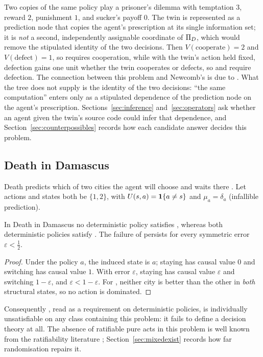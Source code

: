 Two copies of the same policy play a prisoner's dilemma with temptation $3$, reward $2$, punishment
$1$, and sucker's payoff $0$. The twin is represented as a prediction node that copies the agent's
prescription at its single information set; it is \emph{not} a second, independently assignable
coordinate of $\Pi_D$, which would remove the stipulated identity of the two decisions. Then
$V(\text{cooperate})=2$ and $V(\text{defect})=1$, so  requires cooperation, while with the
twin's action held fixed, defection gains one unit whether the twin cooperates or defects, so
 and  require defection. The connection between this problem and Newcomb's is due to
\textcite{lewis1979}. What the tree does not supply is the identity of the two decisions:
\enquote{the same computation} enters only as a stipulated dependence of the prediction node on
the agent's prescription. Sections~\ref{sec:inference} and~\ref{sec:operators} ask whether an agent
given the twin's source code could infer that dependence, and Section~\ref{sec:counterpossibles}
records how each candidate answer decides this problem.

\subsection{Death in Damascus}\label{sec:did}

Death predicts which of two cities the agent will choose and waits there
\autocite{gibbardharper1978}. Let actions and states both be $\{1,2\}$, with
$U(s,a)=\mathbf{1}\{a\neq s\}$ and $\mu_a=\delta_a$ (infallible prediction).

\begin{proposition}\label{prop:did}
In Death in Damascus no deterministic policy satisfies , whereas both deterministic policies
satisfy . The failure of  persists for every symmetric error $\varepsilon<\tfrac12$.
\end{proposition}

\begin{proof}
Under the policy $a$, the induced state is $a$; staying has causal value $0$ and switching has causal
value $1$. With error $\varepsilon$, staying has causal value $\varepsilon$ and switching $1-\varepsilon$,
and $\varepsilon<1-\varepsilon$. For , neither city is better than the other in \emph{both}
structural states, so no action is dominated.
\end{proof}

Consequently , read as a requirement on deterministic policies, is individually
unsatisfiable on any class containing this problem: it fails to define a decision theory at all.
The absence of ratifiable pure acts in this problem is well known from the ratifiability
literature \autocite{skyrms1990ratif}; Section~\ref{sec:mixedexist} records how far randomisation
repairs it.

